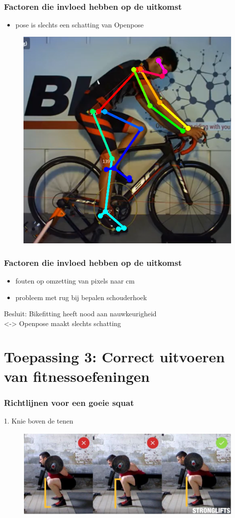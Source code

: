 \documentclass
   [kulak] %
   {kulakbeamer}
\begin{document}
\begin{frame}
	\frametitle{Factoren die invloed hebben op de uitkomst}
	\begin{itemize}
		\item pose is slechts een schatting van Openpose
	\end{itemize}
	\begin{figure}
	\includegraphics[width= .55\textwidth]{prof_bikefit}
	\end{figure}
\end{frame}

\begin{frame}
\frametitle{Factoren die invloed hebben op de uitkomst}
	\begin{itemize}
		\item fouten op omzetting van pixels naar \si{cm}
		\item probleem met rug bij bepalen schouderhoek
	\end{itemize}

Besluit: Bikefitting heeft nood aan nauwkeurigheid\\

<-> Openpose maakt slechts schatting
\end{frame}

\section{Toepassing 3: Correct uitvoeren van fitnessoefeningen}

\begin{frame}
	\frametitle{Richtlijnen voor een goeie squat}
	1. Knie boven de tenen
	\begin{figure}
		\includegraphics[width= \textwidth]{squat_knie}
	\end{figure}
\end{frame}
\end{document}
